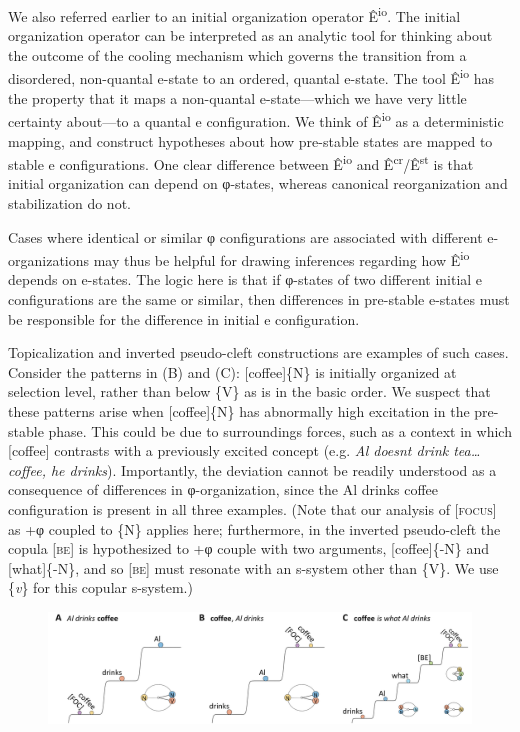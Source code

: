   We also referred earlier to an initial organization operator Ê\textsuperscript{io}. The initial organization operator can be interpreted as an analytic tool for thinking about the outcome of the cooling mechanism which governs the transition from a disordered, non-quantal e-state to an ordered, quantal e-state. The tool Ê\textsuperscript{io} has the property that it maps a non-quantal e-state—which we have very little certainty about—to a quantal e configuration. We think of Ê\textsuperscript{io} as a deterministic mapping, and construct hypotheses about how pre-stable states are mapped to stable e configurations. One clear difference between Ê\textsuperscript{io} and Ê\textsuperscript{cr}/Ê\textsuperscript{st} is that initial organization can depend on φ-states, whereas canonical reorganization and stabilization do not. 

  Cases where identical or similar φ configurations are associated with different e-organizations may thus be helpful for drawing inferences regarding how Ê\textsuperscript{io} depends on e-states. The logic here is that if φ-states of two different initial e configurations are the same or similar, then differences in pre-stable e-states must be responsible for the difference in initial e configuration. 

  Topicalization and inverted pseudo-cleft constructions are examples of such cases. Consider the patterns in (B) and (C): [coffee]\{N\} is initially organized at selection level, rather than below \{V\} as is in the basic order. We suspect that these patterns arise when [coffee]\{N\} has abnormally high excitation in the pre-stable phase. This could be due to surroundings forces, such as a context in which [coffee] contrasts with a previously excited concept (e.g. \textit{Al doesnt drink tea…coffee, he drinks}). Importantly, the deviation cannot be readily understood as a consequence of differences in φ-organization, since the {\textbar}Al drinks coffee{\textbar} configuration is present in all three examples. (Note that our analysis of [\textsc{focus}] as +φ coupled to \{N\} applies here; furthermore, in the inverted pseudo-cleft the copula [\textsc{be}] is hypothesized to +φ couple with two arguments, [coffee]\{-N\} and [what]\{-N\}, and so [\textsc{be}] must resonate with an s-system other than \{V\}. We use \{\textit{v}\} for this copular s-system.)

  
\begin{figure}
\includegraphics[width=\textwidth]{figures/Tilsen-img78.png}
\caption{\missingcaption}
\label{fig:}
\end{figure}
 

